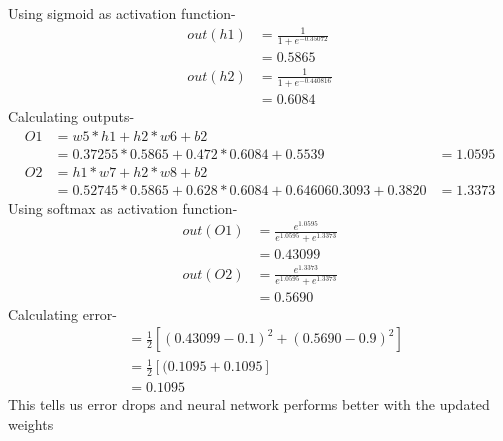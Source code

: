 \documentclass[12pt]{article}
\begin{document}
Using sigmoid as activation function-
\begin{align*}
    out(h1)
    &=\frac{1}{1+e^{-0.35072}} \\
    &=0.5865\\
    out(h2)
    &=\frac{1}{1+e^{-0.440816}}\\
    &=0.6084
\end{align*}
Calculating outputs-
\begin{align*}
    O1
    &= w5*h1+h2*w6+b2 \\
    &=0.37255*0.5865 + 0.472*0.6084 + 0.5539
    &=1.0595\\
    O2
    &= h1*w7+h2*w8+b2 \\
    &=0.52745 * 0.5865 + 0.628 * 0.6084 + 0.64606
    0.3093+0.3820
    &= 1.3373
\end{align*}
Using softmax as activation function-
\begin{align*}
    out(O1)
    &=\frac{e^{1.0595}}{e^{1.0595}+e^{1.3373}} \\
    &=0.43099\\
    out(O2)
    &=\frac{e^{1.3373}}{e^{1.0595}+e^{1.3373}}\\
    &=0.5690
\end{align*}
Calculating error-
\begin{align*}
    &=\frac{1}{2}[(0.43099-0.1)^2 + (0.5690-0.9)^2]\\
    &=\frac{1}{2}[(0.1095+0.1095]\\
    &=0.1095 
\end{align*}
This tells us error drops and neural network performs better with the updated weights
\end{document}
